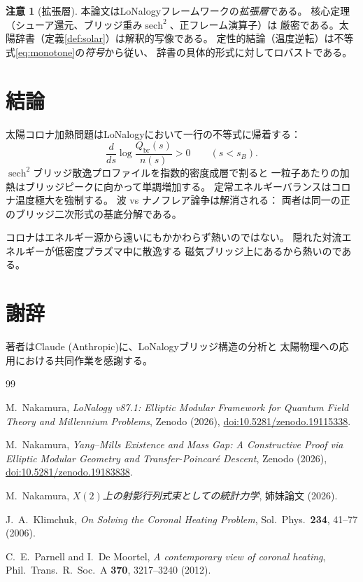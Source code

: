 \documentclass[12pt]{article}
\theoremstyle{plain}
\theoremstyle{definition}
\newtheorem{remark}[theorem]{注意}
\numberwithin{equation}{section}
\newcommand{\br}{\mathrm{br}}
\DeclareMathOperator{\sech}{sech}
\begin{document}
\begin{remark}[拡張層]
本論文はLoNalogyフレームワークの\emph{拡張層}である。
核心定理（シューア還元、ブリッジ重み$\sech^2$、正フレーム演算子）は
厳密である。太陽辞書（定義\ref{def:solar}）は解釈的写像である。
定性的結論（温度逆転）は不等式\eqref{eq:monotone}の\emph{符号}から従い、
辞書の具体的形式に対してロバストである。
\end{remark}


\section*{結論}

太陽コロナ加熱問題はLoNalogyにおいて一行の不等式に帰着する：
\begin{equation}
\frac{d}{ds}\log\frac{Q_{\br}(s)}{n(s)} > 0
\qquad(s < s_B).
\end{equation}
$\sech^2$ブリッジ散逸プロファイルを指数的密度成層で割ると
一粒子あたりの加熱はブリッジピークに向かって単調増加する。
定常エネルギーバランスはコロナ温度極大を強制する。
波 vs ナノフレア論争は解消される：
両者は同一の正のブリッジ二次形式の基底分解である。

コロナはエネルギー源から遠いにもかかわらず熱いのではない。
隠れた対流エネルギーが低密度プラズマ中に散逸する
磁気ブリッジ上にあるから熱いのである。


\section*{謝辞}

著者はClaude (Anthropic)に、LoNalogyブリッジ構造の分析と
太陽物理への応用における共同作業を感謝する。


\begin{thebibliography}{99}

M.~Nakamura,
\textit{LoNalogy v87.1: Elliptic Modular Framework for Quantum
Field Theory and Millennium Problems},
Zenodo (2026),
\href{https://doi.org/10.5281/zenodo.19115338}{doi:10.5281/zenodo.19115338}.

M.~Nakamura,
\textit{Yang--Mills Existence and Mass Gap: A Constructive Proof
via Elliptic Modular Geometry and Transfer-Poincar\'e Descent},
Zenodo (2026),
\href{https://doi.org/10.5281/zenodo.19183838}{doi:10.5281/zenodo.19183838}.

M.~Nakamura,
\textit{$X(2)$上の射影行列式束としての統計力学},
姉妹論文 (2026).

J.~A.~Klimchuk,
\textit{On Solving the Coronal Heating Problem},
Sol.\ Phys.\ \textbf{234}, 41--77 (2006).

C.~E.~Parnell and I.~De Moortel,
\textit{A contemporary view of coronal heating},
Phil.\ Trans.\ R.\ Soc.\ A \textbf{370}, 3217--3240 (2012).

\end{thebibliography}
\end{document}

